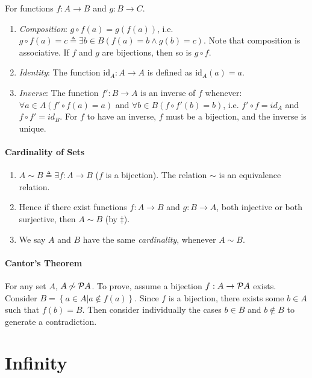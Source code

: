 \documentclass[10pt,twoside,twocolumn]{article}
\begin{document}
For functions $f:A\rightarrow B$ and $g:B\rightarrow C$.
\begin{enumerate}
\item \emph{Composition}: $g\circ f\left(a\right)=g\left(f\left(a\right)\right)$,
i.e. $g\circ f\left(a\right)=c\triangleq\exists b\in B\left(f\left(a\right)=b\land g\left(b\right)=c\right)$.
Note that composition is associative. If $f$ and $g$ are bijections,
then so is $g\circ f$.
\item \emph{Identity}: The function $\mbox{id}_{A}:A\rightarrow A$ is defined
as $\mbox{id}_{A}\left(a\right)=a$.
\item \emph{Inverse}: The function $f':B\rightarrow A$ is an inverse of
$f$ whenever: $\forall a\in A\left(f'\circ f\left(a\right)=a\right)$
and $\forall b\in B\left(f\circ f'\left(b\right)=b\right)$, i.e.
$f'\circ f=id_{A}$ and $f\circ f'=id_{B}$. For $f$ to have an inverse,
$f$ must be a bijection, and the inverse is unique.
\end{enumerate}

\paragraph{Cardinality of Sets}
\begin{enumerate}
\item $A\sim B\triangleq\exists f:A\rightarrow B$ ($f$ is a bijection).
The relation $\sim$ is an equivalence relation.
\item Hence if there exist functions $f:A\rightarrow B$ and $g:B\rightarrow A$,
both injective or both surjective, then $A\sim B$ (by $\ddagger$).
\item We say $A$ and $B$ have the same \emph{cardinality}, whenever $A\sim B$.
\end{enumerate}

\paragraph{Cantor's Theorem}

For any set $A$, $A\not\sim{\cal P}A$. To prove, assume a bijection
$f:A\rightarrow{\cal P}A$ exists. Consider $B=\left\{ a\in A|a\notin f\left(a\right)\right\} $.
Since $f$ is a bijection, there exists some $b\in A$ such that $f\left(b\right)=B$.
Then consider individually the cases $b\in B$ and $b\notin B$ to
generate a contradiction.


\section{Infinity}
\end{document}
